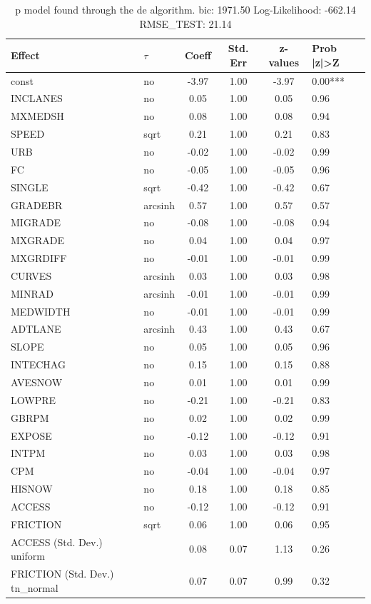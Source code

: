 \begin{table}
	\caption{p model found through the de algorithm. bic: 1971.50 Log-Likelihood: -662.14 RMSE_TEST: 21.14}
	\begin{center}
		\begin{tabular}{|l|l|c|c|c|l|}
			\hline
			Effect & $\tau$ & Coeff & Std. Err & z-values & Prob |z|>Z \\
			\hline
			const & no & -3.97 & 1.00 & -3.97 & 0.00*** \\
			\hline
			INCLANES & no & 0.05 & 1.00 & 0.05 & 0.96 \\
			\hline
			MXMEDSH & no & 0.08 & 1.00 & 0.08 & 0.94 \\
			\hline
			SPEED & sqrt & 0.21 & 1.00 & 0.21 & 0.83 \\
			\hline
			URB & no & -0.02 & 1.00 & -0.02 & 0.99 \\
			\hline
			FC & no & -0.05 & 1.00 & -0.05 & 0.96 \\
			\hline
			SINGLE & sqrt & -0.42 & 1.00 & -0.42 & 0.67 \\
			\hline
			GRADEBR & arcsinh & 0.57 & 1.00 & 0.57 & 0.57 \\
			\hline
			MIGRADE & no & -0.08 & 1.00 & -0.08 & 0.94 \\
			\hline
			MXGRADE & no & 0.04 & 1.00 & 0.04 & 0.97 \\
			\hline
			MXGRDIFF & no & -0.01 & 1.00 & -0.01 & 0.99 \\
			\hline
			CURVES & arcsinh & 0.03 & 1.00 & 0.03 & 0.98 \\
			\hline
			MINRAD & arcsinh & -0.01 & 1.00 & -0.01 & 0.99 \\
			\hline
			MEDWIDTH & no & -0.01 & 1.00 & -0.01 & 0.99 \\
			\hline
			ADTLANE & arcsinh & 0.43 & 1.00 & 0.43 & 0.67 \\
			\hline
			SLOPE & no & 0.05 & 1.00 & 0.05 & 0.96 \\
			\hline
			INTECHAG & no & 0.15 & 1.00 & 0.15 & 0.88 \\
			\hline
			AVESNOW & no & 0.01 & 1.00 & 0.01 & 0.99 \\
			\hline
			LOWPRE & no & -0.21 & 1.00 & -0.21 & 0.83 \\
			\hline
			GBRPM & no & 0.02 & 1.00 & 0.02 & 0.99 \\
			\hline
			EXPOSE & no & -0.12 & 1.00 & -0.12 & 0.91 \\
			\hline
			INTPM & no & 0.03 & 1.00 & 0.03 & 0.98 \\
			\hline
			CPM & no & -0.04 & 1.00 & -0.04 & 0.97 \\
			\hline
			HISNOW & no & 0.18 & 1.00 & 0.18 & 0.85 \\
			\hline
			ACCESS & no & -0.12 & 1.00 & -0.12 & 0.91 \\
			\hline
			FRICTION & sqrt & 0.06 & 1.00 & 0.06 & 0.95 \\
			\hline
			ACCESS (Std. Dev.) uniform &  & 0.08 & 0.07 & 1.13 & 0.26 \\
			\hline
			FRICTION (Std. Dev.) tn_normal &  & 0.07 & 0.07 & 0.99 & 0.32 \\
			\hline
		\end{tabular}
	\end{center}
\end{table}